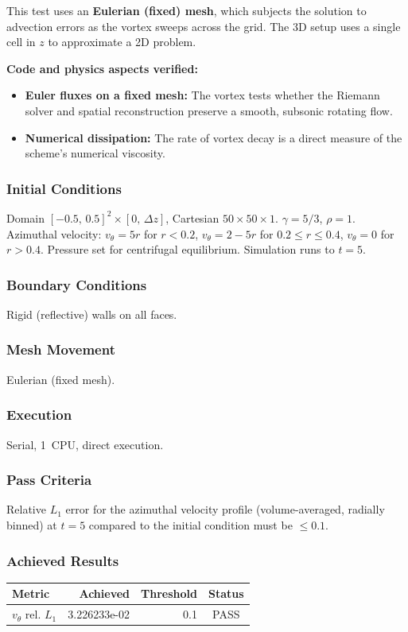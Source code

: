 \documentclass[11pt,a4paper]{article}
\begin{document}
This test uses an \textbf{Eulerian (fixed) mesh}, which subjects the solution to advection errors as the vortex sweeps across the grid. The 3D setup uses a single cell in $z$ to approximate a 2D problem.

\textbf{Code and physics aspects verified:}
\begin{itemize}
  \item \textbf{Euler fluxes on a fixed mesh:} The vortex tests whether the Riemann solver and spatial reconstruction preserve a smooth, subsonic rotating flow.
  \item \textbf{Numerical dissipation:} The rate of vortex decay is a direct measure of the scheme's numerical viscosity.
\end{itemize}

\subsubsection*{Initial Conditions}
Domain $[-0.5,\,0.5]^2 \times [0,\,\Delta z]$, Cartesian $50\times50\times1$. $\gamma = 5/3$, $\rho = 1$. Azimuthal velocity: $v_\theta = 5r$ for $r<0.2$, $v_\theta = 2-5r$ for $0.2 \le r \le 0.4$, $v_\theta = 0$ for $r>0.4$. Pressure set for centrifugal equilibrium. Simulation runs to $t = 5$.

\subsubsection*{Boundary Conditions}
Rigid (reflective) walls on all faces.

\subsubsection*{Mesh Movement}
Eulerian (fixed mesh).

\subsubsection*{Execution}
Serial, 1~CPU, direct execution.

\subsubsection*{Pass Criteria}
Relative $L_1$ error for the azimuthal velocity profile (volume-averaged, radially binned) at $t=5$ compared to the initial condition must be $\le 0.1$.

\subsubsection*{Achieved Results}
\begin{table}[htbp]
\centering
\begin{tabular}{l r r c}
\toprule
\textbf{Metric} & \textbf{Achieved} & \textbf{Threshold} & \textbf{Status} \\
\midrule
$v_\theta$ rel. $L_1$ & 3.226233e-02 & 0.1 & {\color{green!60!black}PASS} \\
\bottomrule
\end{tabular}
\end{table}
\end{document}
